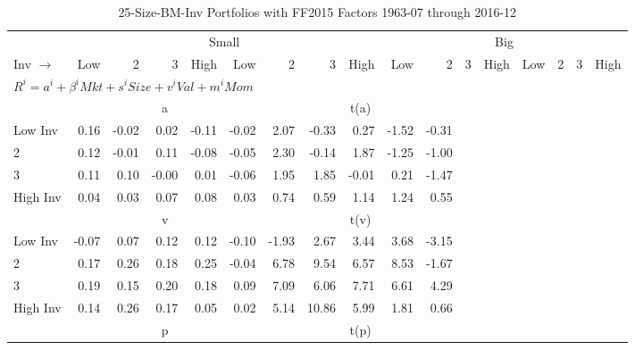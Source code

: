 
\begin{table}[!ht]
\centering
\caption{25-Size-BM-Inv Portfolios with FF2015 Factors 1963-07 through 2016-12}
\begin{tabular}{lrrrrrrrrrrrrrrrr}
  \toprule
    & \multicolumn{8}{c}{Small} & \multicolumn{8}{c}{Big} \\
      \cmidrule(r){2-9} \cmidrule(r){10-17}
    Inv $\rightarrow$ & Low & 2 & 3 & High & Low & 2 & 3 & High & Low & 2 & 3 & High & Low & 2 & 3 & High \\ 
  \midrule
  \multicolumn{11}{l}{$R^i=a^i+\beta^iMkt+s^iSize+v^iVal+m^iMom$} \\

  
    
      & \multicolumn{5}{c}{a} & \multicolumn{5}{c}{t(a)}
    
    \\
      \cmidrule(r){2-5} \cmidrule(r){6-9} \cmidrule(r){10-13} \cmidrule(r){14-17}

    Low Inv   & 0.16  & -0.02  & 0.02  & -0.11  & -0.02  & 2.07  & -0.33  & 0.27  & -1.52  & -0.31  \\
           2  & 0.12  & -0.01  & 0.11  & -0.08  & -0.05  & 2.30  & -0.14  & 1.87  & -1.25  & -1.00  \\
           3  & 0.11  & 0.10  & -0.00  & 0.01  & -0.06  & 1.95  & 1.85  & -0.01  & 0.21  & -1.47  \\
    High Inv  & 0.04  & 0.03  & 0.07  & 0.08  & 0.03  & 0.74  & 0.59  & 1.14  & 1.24  & 0.55  \\

  
    
      & \multicolumn{5}{c}{v} & \multicolumn{5}{c}{t(v)}
    
    \\
      \cmidrule(r){2-5} \cmidrule(r){6-9} \cmidrule(r){10-13} \cmidrule(r){14-17}

    Low Inv   & -0.07  & 0.07  & 0.12  & 0.12  & -0.10  & -1.93  & 2.67  & 3.44  & 3.68  & -3.15  \\
           2  & 0.17  & 0.26  & 0.18  & 0.25  & -0.04  & 6.78  & 9.54  & 6.57  & 8.53  & -1.67  \\
           3  & 0.19  & 0.15  & 0.20  & 0.18  & 0.09  & 7.09  & 6.06  & 7.71  & 6.61  & 4.29  \\
    High Inv  & 0.14  & 0.26  & 0.17  & 0.05  & 0.02  & 5.14  & 10.86  & 5.99  & 1.81  & 0.66  \\

  
    
      & \multicolumn{5}{c}{p} & \multicolumn{5}{c}{t(p)}
    

\end{tabular}
\end{table}
